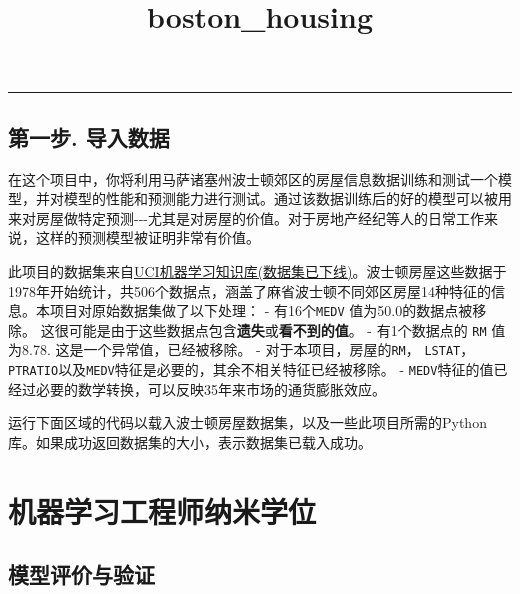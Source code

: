 \documentclass[11pt]{article}
\title{boston\_housing}
\begin{document}
    
    
    \maketitle
    
    

    
    \begin{center}\rule{0.5\linewidth}{\linethickness}\end{center}

\subsection{第一步.
导入数据}\label{ux7b2cux4e00ux6b65.-ux5bfcux5165ux6570ux636e}

在这个项目中，你将利用马萨诸塞州波士顿郊区的房屋信息数据训练和测试一个模型，并对模型的性能和预测能力进行测试。通过该数据训练后的好的模型可以被用来对房屋做特定预测-\/-\/-尤其是对房屋的价值。对于房地产经纪等人的日常工作来说，这样的预测模型被证明非常有价值。

此项目的数据集来自\href{https://archive.ics.uci.edu/ml/datasets.html}{UCI机器学习知识库(数据集已下线)}。波士顿房屋这些数据于1978年开始统计，共506个数据点，涵盖了麻省波士顿不同郊区房屋14种特征的信息。本项目对原始数据集做了以下处理：
- 有16个\texttt{\textquotesingle{}MEDV\textquotesingle{}}
值为50.0的数据点被移除。
这很可能是由于这些数据点包含\textbf{遗失}或\textbf{看不到的值}。 -
有1个数据点的 \texttt{\textquotesingle{}RM\textquotesingle{}} 值为8.78.
这是一个异常值，已经被移除。 -
对于本项目，房屋的\texttt{\textquotesingle{}RM\textquotesingle{}}，
\texttt{\textquotesingle{}LSTAT\textquotesingle{}}，\texttt{\textquotesingle{}PTRATIO\textquotesingle{}}以及\texttt{\textquotesingle{}MEDV\textquotesingle{}}特征是必要的，其余不相关特征已经被移除。
-
\texttt{\textquotesingle{}MEDV\textquotesingle{}}特征的值已经过必要的数学转换，可以反映35年来市场的通货膨胀效应。

运行下面区域的代码以载入波士顿房屋数据集，以及一些此项目所需的Python库。如果成功返回数据集的大小，表示数据集已载入成功。

    \section{机器学习工程师纳米学位}\label{ux673aux5668ux5b66ux4e60ux5de5ux7a0bux5e08ux7eb3ux7c73ux5b66ux4f4d}

\subsection{模型评价与验证}\label{ux6a21ux578bux8bc4ux4ef7ux4e0eux9a8cux8bc1}
\end{document}
